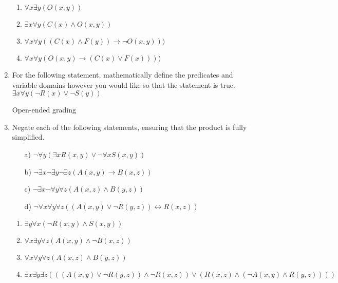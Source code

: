 \begin{enumerate}
    \vspace{2mm}
    \begin{solution}
    \begin{enumerate}
        \item $\forall x \exists y (O(x,y))$
        \item $\exists x \forall y (C(x) \land O(x,y))$
        \item $\forall x \forall y ((C(x) \land F(y)) \rightarrow \neg O(x,y)))$
        \item $\forall x \forall y (O(x,y) \rightarrow (C(x) \lor F(x))))$
    \end{enumerate}
    \end{solution}
    
    \item For the following statement, mathematically define the predicates and variable domains however you would like so that the statement is true.  \\

    $\exists x \forall y (\neg R(x) \lor \neg S(y))$
    
    \vspace{2mm}
    \begin{solution}
    Open-ended grading 
    \end{solution}
    
    \item Negate each of the following statements, ensuring that the product is fully simplified. 
    
    \begin{enumerate}
        \item[a)] $\neg  \forall y (\exists x R(x,y) \lor \neg \forall x S(x,y))$
        \item[b)] $\neg  \exists x \neg \exists y \neg \exists z (A(x,y) \rightarrow B(x,z))$ 
        \item[c)] $\neg  \exists x \neg \forall y \forall z (A(x,z) \land B(y,z))$
        \item[d)] $\neg \forall x \forall y \forall z ((A(x,y) \lor \neg R(y,z)) \longleftrightarrow R(x,z))$
    \end{enumerate}
    
    \vspace{2mm}
    \begin{solution}
    \begin{enumerate}
        \item $\exists y \forall x (\neg R(x,y) \land S(x,y))$
        \item $\forall x \exists y \forall z (A(x,y) \land \neg B(x,z))$
        \item $\forall x \forall y \forall z (A(x,z) \land B(y,z))$
        \item $\exists x \exists y \exists z (((A(x,y) \lor \neg R(y,z)) \land \neg R(x,z)) \lor (R(x,z) \land (\neg A(x,y) \land R(y,z))))$
    \end{enumerate}
    \end{solution}
    

\end{enumerate}
